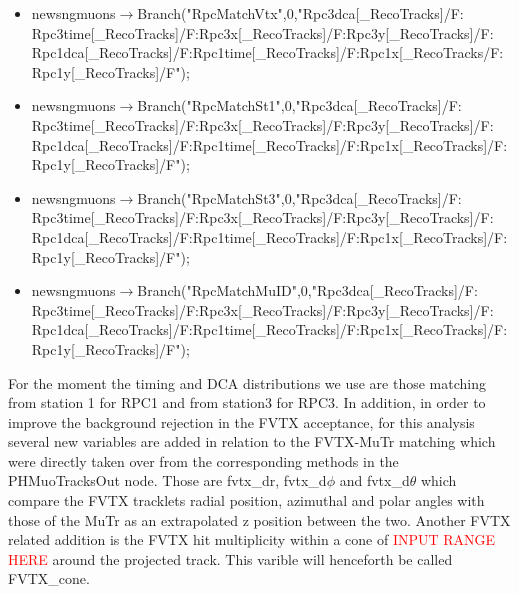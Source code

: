 \begin{itemize}
\item newsngmuons$\rightarrow$Branch("RpcMatchVtx",0,"Rpc3dca[\_RecoTracks]/F:\\Rpc3time[\_RecoTracks]/F:Rpc3x[\_RecoTracks]/F:Rpc3y[\_RecoTracks]/F:\\Rpc1dca[\_RecoTracks]/F:Rpc1time[\_RecoTracks]/F:Rpc1x[\_RecoTracks/F:\\Rpc1y[\_RecoTracks]/F");
\item newsngmuons$\rightarrow$Branch("RpcMatchSt1",0,"Rpc3dca[\_RecoTracks]/F:\\Rpc3time[\_RecoTracks]/F:Rpc3x[\_RecoTracks]/F:Rpc3y[\_RecoTracks]/F:\\Rpc1dca[\_RecoTracks]/F:Rpc1time[\_RecoTracks]/F:Rpc1x[\_RecoTracks]/F:\\Rpc1y[\_RecoTracks]/F");
\item newsngmuons$\rightarrow$Branch("RpcMatchSt3",0,"Rpc3dca[\_RecoTracks]/F:\\Rpc3time[\_RecoTracks]/F:Rpc3x[\_RecoTracks]/F:Rpc3y[\_RecoTracks]/F:\\Rpc1dca[\_RecoTracks]/F:Rpc1time[\_RecoTracks]/F:Rpc1x[\_RecoTracks]/F:\\Rpc1y[\_RecoTracks]/F");
\item newsngmuons$\rightarrow$Branch("RpcMatchMuID",0,"Rpc3dca[\_RecoTracks]/F:\\Rpc3time[\_RecoTracks]/F:Rpc3x[\_RecoTracks]/F:Rpc3y[\_RecoTracks]/F:\\Rpc1dca[\_RecoTracks]/F:Rpc1time[\_RecoTracks]/F:Rpc1x[\_RecoTracks]/F:\\Rpc1y[\_RecoTracks]/F");
\end{itemize}



For the moment the timing and DCA distributions we use are those matching from
station 1 for RPC1 and from station3 for RPC3.  In addition, in order to improve
the background rejection in the FVTX acceptance, for this analysis several new
variables are added in relation to the FVTX-MuTr matching which were directly
taken over from the corresponding methods  in the PHMuoTracksOut node. Those are
fvtx\_dr, fvtx\_d$\phi$ and fvtx\_d$\theta$ which compare the FVTX tracklets
radial position, azimuthal and polar angles with those of the MuTr as an
extrapolated z position between the two.  Another FVTX related addition is the
FVTX hit multiplicity within a cone of \textcolor{red}{INPUT RANGE HERE}  around
the projected track. This varible will henceforth be called FVTX\_cone.  

